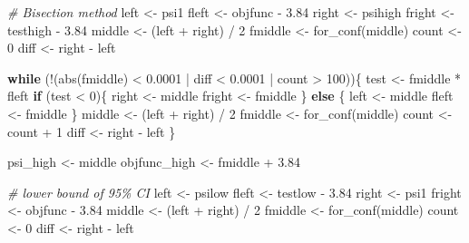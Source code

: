 \documentclass[
  10pt,
]{book}
\newenvironment{Shaded}{\begin{snugshade}}{\end{snugshade}}
\newcommand{\CommentTok}[1]{\textcolor[rgb]{0.56,0.35,0.01}{\textit{#1}}}
\newcommand{\ControlFlowTok}[1]{\textcolor[rgb]{0.13,0.29,0.53}{\textbf{#1}}}
\newcommand{\DecValTok}[1]{\textcolor[rgb]{0.00,0.00,0.81}{#1}}
\newcommand{\FloatTok}[1]{\textcolor[rgb]{0.00,0.00,0.81}{#1}}
\newcommand{\FunctionTok}[1]{\textcolor[rgb]{0.00,0.00,0.00}{#1}}
\newcommand{\NormalTok}[1]{#1}
\newcommand{\OtherTok}[1]{\textcolor[rgb]{0.56,0.35,0.01}{#1}}
\newcommand{\SpecialCharTok}[1]{\textcolor[rgb]{0.00,0.00,0.00}{#1}}
\begin{document}
\begin{Shaded}
\begin{Highlighting}[]
    \CommentTok{\# Bisection method}
\NormalTok{    left }\OtherTok{\textless{}{-}}\NormalTok{ psi1}
\NormalTok{    fleft }\OtherTok{\textless{}{-}}\NormalTok{ objfunc }\SpecialCharTok{{-}} \FloatTok{3.84}
\NormalTok{    right }\OtherTok{\textless{}{-}}\NormalTok{ psihigh}
\NormalTok{    fright }\OtherTok{\textless{}{-}}\NormalTok{ testhigh }\SpecialCharTok{{-}} \FloatTok{3.84}
\NormalTok{    middle }\OtherTok{\textless{}{-}}\NormalTok{ (left  }\SpecialCharTok{+}\NormalTok{ right) }\SpecialCharTok{/} \DecValTok{2}
\NormalTok{    fmiddle }\OtherTok{\textless{}{-}} \FunctionTok{for\_conf}\NormalTok{(middle)}
\NormalTok{    count }\OtherTok{\textless{}{-}} \DecValTok{0}
\NormalTok{    diff }\OtherTok{\textless{}{-}}\NormalTok{ right }\SpecialCharTok{{-}}\NormalTok{ left}
    
    \ControlFlowTok{while}\NormalTok{ (}\SpecialCharTok{!}\NormalTok{(}\FunctionTok{abs}\NormalTok{(fmiddle) }\SpecialCharTok{\textless{}} \FloatTok{0.0001} \SpecialCharTok{|}\NormalTok{ diff }\SpecialCharTok{\textless{}} \FloatTok{0.0001} \SpecialCharTok{|}\NormalTok{ count }\SpecialCharTok{\textgreater{}} \DecValTok{100}\NormalTok{))\{}
\NormalTok{      test }\OtherTok{\textless{}{-}}\NormalTok{ fmiddle }\SpecialCharTok{*}\NormalTok{ fleft}
      \ControlFlowTok{if}\NormalTok{ (test }\SpecialCharTok{\textless{}} \DecValTok{0}\NormalTok{)\{}
\NormalTok{        right }\OtherTok{\textless{}{-}}\NormalTok{ middle}
\NormalTok{        fright }\OtherTok{\textless{}{-}}\NormalTok{ fmiddle}
\NormalTok{      \} }\ControlFlowTok{else}\NormalTok{ \{}
\NormalTok{        left }\OtherTok{\textless{}{-}}\NormalTok{ middle}
\NormalTok{        fleft }\OtherTok{\textless{}{-}}\NormalTok{ fmiddle}
\NormalTok{      \}}
\NormalTok{      middle }\OtherTok{\textless{}{-}}\NormalTok{ (left }\SpecialCharTok{+}\NormalTok{ right) }\SpecialCharTok{/} \DecValTok{2}
\NormalTok{      fmiddle }\OtherTok{\textless{}{-}} \FunctionTok{for\_conf}\NormalTok{(middle)}
\NormalTok{      count }\OtherTok{\textless{}{-}}\NormalTok{ count }\SpecialCharTok{+} \DecValTok{1}
\NormalTok{      diff }\OtherTok{\textless{}{-}}\NormalTok{ right }\SpecialCharTok{{-}}\NormalTok{ left}
\NormalTok{    \}}
    
\NormalTok{    psi\_high }\OtherTok{\textless{}{-}}\NormalTok{ middle}
\NormalTok{    objfunc\_high }\OtherTok{\textless{}{-}}\NormalTok{ fmiddle }\SpecialCharTok{+} \FloatTok{3.84}
    
    \CommentTok{\# lower bound of 95\% CI}
\NormalTok{    left }\OtherTok{\textless{}{-}}\NormalTok{ psilow}
\NormalTok{    fleft }\OtherTok{\textless{}{-}}\NormalTok{ testlow }\SpecialCharTok{{-}} \FloatTok{3.84}
\NormalTok{    right }\OtherTok{\textless{}{-}}\NormalTok{ psi1}
\NormalTok{    fright }\OtherTok{\textless{}{-}}\NormalTok{ objfunc }\SpecialCharTok{{-}} \FloatTok{3.84}
\NormalTok{    middle }\OtherTok{\textless{}{-}}\NormalTok{ (left }\SpecialCharTok{+}\NormalTok{ right) }\SpecialCharTok{/} \DecValTok{2}
\NormalTok{    fmiddle }\OtherTok{\textless{}{-}} \FunctionTok{for\_conf}\NormalTok{(middle)}
\NormalTok{    count }\OtherTok{\textless{}{-}} \DecValTok{0}
\NormalTok{    diff }\OtherTok{\textless{}{-}}\NormalTok{ right }\SpecialCharTok{{-}}\NormalTok{ left}
    

\end{Highlighting}
\end{Shaded}
\end{document}
